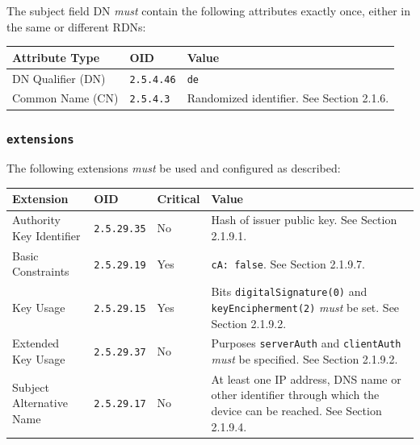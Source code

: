 The subject field DN \textit{must} contain the following attributes exactly once, either in the same or different RDNs:

\vspace*{0.5cm}
\noindent\begin{tabularx}{\textwidth}{| p{4cm} | p{2cm} | X |} \hline
\rowcolor{gray!33} Attribute Type & OID               & Value \\ \hline

DN Qualifier (DN)                 & \texttt{2.5.4.46} & \texttt{de} \\ \hline
Common Name (CN)                  & \texttt{2.5.4.3}  &  Randomized identifier. See Section 2.1.6. \\ \hline

\end{tabularx}
\vspace*{0.5cm}

\subsubsection{\texttt{extensions}}

The following extensions \textit{must} be used and configured as described:

\vspace*{0.5cm}
\noindent\begin{tabularx}{\textwidth}{| p{4cm} | p{2cm} | p{1.2cm} | X |} \hline
\rowcolor{gray!33} Extension & OID                & Critical & Value \\ \hline

Authority Key Identifier     & \texttt{2.5.29.35} & No       & Hash of issuer public key. See Section 2.1.9.1. \\ \hline
Basic Constraints            & \texttt{2.5.29.19} & Yes      & \texttt{cA: false}. See Section 2.1.9.7. \\ \hline
Key Usage                    & \texttt{2.5.29.15} & Yes      & Bits \texttt{digitalSignature(0)} and \texttt{keyEncipherment(2)} \textit{must} be set. See Section 2.1.9.2. \\ \hline
Extended Key Usage           & \texttt{2.5.29.37} & No       & Purposes \texttt{serverAuth} and \texttt{clientAuth} \textit{must} be specified. See Section 2.1.9.2. \\ \hline
Subject Alternative Name     & \texttt{2.5.29.17} & No       & At least one IP address, DNS name or other identifier through which the device can be reached. See Section 2.1.9.4. \\ \hline

\end{tabularx}
\vspace*{0.5cm}

